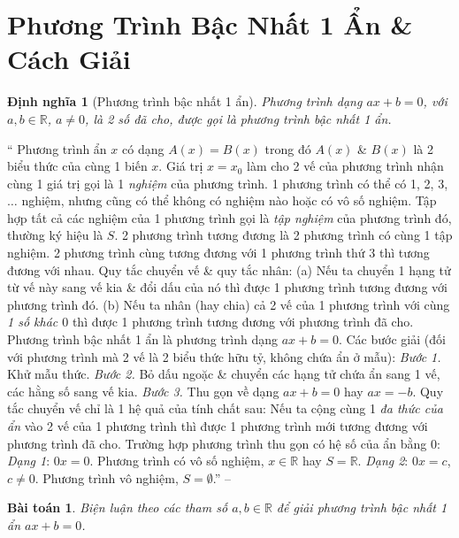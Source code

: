 \documentclass{article}
\numberwithin{equation}{section}
\newtheorem{baitoan}{Bài toán}
\newtheorem{dinhnghia}{Định nghĩa}[section]
\begin{document}
\section{Phương Trình Bậc Nhất 1 Ẩn \& Cách Giải}

\begin{dinhnghia}[Phương trình bậc nhất 1 ẩn]
	Phương trình dạng $ax + b = 0$, với $a,b\in\mathbb{R}$, $a\ne0$, là 2 số đã cho, được gọi là \emph{phương trình bậc nhất 1 ẩn}.
\end{dinhnghia}

`` Phương trình ẩn $x$ có dạng $A(x) = B(x)$ trong đó $A(x)$ \& $B(x)$ là 2 biểu thức của cùng 1 biến $x$. Giá trị $x = x_0$ làm cho 2 vế của phương trình nhận cùng 1 giá trị gọi là 1 \textit{nghiệm} của phương trình. 1 phương trình có thể có 1, 2, 3, $\ldots$ nghiệm, nhưng cũng có thể không có nghiệm nào hoặc có vô số nghiệm. Tập hợp tất cả các nghiệm của 1 phương trình gọi là \textit{tập nghiệm} của phương trình đó, thường ký hiệu là $S$.  2 phương trình tương đương là 2 phương trình có cùng 1 tập nghiệm. 2 phương trình cùng tương đương với 1 phương trình thứ 3 thì tương đương với nhau.  Quy tắc chuyển vế \& quy tắc nhân: (a) Nếu ta chuyển 1 hạng tử từ vế này sang vế kia \& đổi dấu của nó thì được 1 phương trình tương đương với phương trình đó. (b) Nếu ta nhân (hay chia) cả 2 vế của 1 phương trình với cùng \textit{1 số khác $0$} thì được 1 phương trình tương đương với phương trình đã cho.  Phương trình bậc nhất 1 ẩn là phương trình dạng $ax + b = 0$. Các bước giải (đối với phương trình mà 2 vế là 2 biểu thức hữu tỷ, không chứa ẩn ở mẫu): \textit{Bước 1.} Khử mẫu thức. \textit{Bước 2.} Bỏ dấu ngoặc \& chuyển các hạng tử chứa ẩn sang 1 vế, các hằng số sang vế kia. \textit{Bước 3.} Thu gọn về dạng $ax + b = 0$ hay $ax = -b$.  Quy tắc chuyển vế chỉ là 1 hệ quả của tính chất sau: Nếu ta cộng cùng 1 \textit{đa thức của ẩn} vào 2 vế của 1 phương trình thì được 1 phương trình mới tương đương với phương trình đã cho.  Trường hợp phương trình thu gọn có hệ số của ẩn bằng $0$: \textit{Dạng 1}: $0x = 0$. Phương trình có vô số nghiệm, $x\in\mathbb{R}$ hay $S = \mathbb{R}$. \textit{Dạng 2}: $0x = c$, $c\ne 0$. Phương trình vô nghiệm, $S = \emptyset$.'' -- \cite[Chap. III, \S1, pp. 53--54]{Tuyen_Toan_8}

\begin{baitoan}
	Biện luận theo các tham số $a,b\in\mathbb{R}$ để giải phương trình bậc nhất 1 ẩn $ax + b = 0$.
\end{baitoan}
\end{document}
